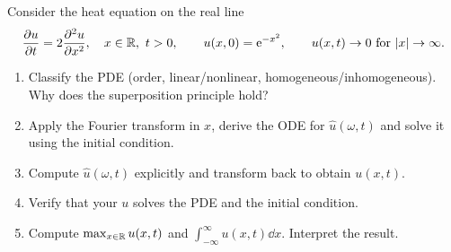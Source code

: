 Consider the heat equation on the real line
\[
\frac{\partial u}{\partial t}=2\frac{\partial^2u}{\partial x^2},\quad x\in\mathbb{R},\ t>0,\qquad u(x,0)=\mathrm{e}^{-x^2},\qquad u(x,t)\to0\ \text{for } \lvert x\rvert\to\infty.
\]
\begin{enumerate}
\item Classify the PDE (order, linear/nonlinear, homogeneous/inhomogeneous). Why does the superposition principle hold?
\item Apply the Fourier transform in $x$, derive the ODE for $\hat u(\omega,t)$ and solve it using the initial condition.
\item Compute $\hat u(\omega,t)$ explicitly and transform back to obtain $u(x,t)$.
\item Verify that your $u$ solves the PDE and the initial condition.
\item Compute $\max_{x\in\mathbb{R}}u(x,t)$ and $\int_{-\infty}^\infty u(x,t)\dd x$. Interpret the result.
\end{enumerate}

